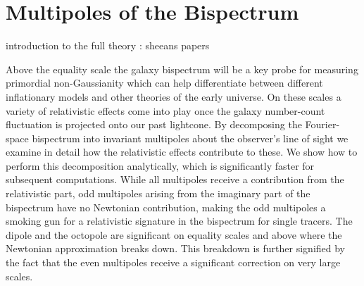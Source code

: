 \chapter{Multipoles of the Bispectrum}
\label{chapter:multipoles}



introduction to the full theory : sheeans papers

Above the equality scale the galaxy bispectrum will be  a key probe for measuring primordial non-Gaussianity which can help differentiate between different inflationary models and other theories of the early universe. On these scales a variety of relativistic effects come into play once the galaxy number-count fluctuation is projected onto our past lightcone. By decomposing the Fourier-space bispectrum into invariant multipoles about the observer's line of sight we examine in detail how the relativistic effects contribute to these. We show how to perform this decomposition analytically, which is significantly faster for subsequent computations.  While all multipoles receive a contribution from the relativistic part, odd multipoles arising from the imaginary part of the bispectrum have no Newtonian contribution, making the odd multipoles a smoking gun for a relativistic signature in the bispectrum for single tracers.  The dipole and the octopole are significant on equality scales and above where the Newtonian approximation breaks down. This breakdown is further signified by the fact that the even multipoles receive a significant correction on very large scales.

